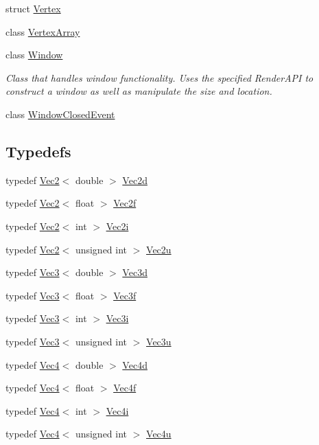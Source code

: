 \begin{DoxyCompactItemize}
\item 
struct \hyperlink{structpcs_1_1Vertex}{Vertex}
\item 
class \hyperlink{classpcs_1_1VertexArray}{Vertex\+Array}
\item 
class \hyperlink{classpcs_1_1Window}{Window}
\begin{DoxyCompactList}\small\item\em Class that handles window functionality. Uses the specified Render\+A\+PI to construct a window as well as manipulate the size and location. \end{DoxyCompactList}\item 
class \hyperlink{classpcs_1_1WindowClosedEvent}{Window\+Closed\+Event}
\end{DoxyCompactItemize}
\subsection*{Typedefs}
\begin{DoxyCompactItemize}
\item 
typedef \hyperlink{structpcs_1_1Vec2}{Vec2}$<$ double $>$ \hyperlink{namespacepcs_acc216b704c01ee5f725075dabe53e085}{Vec2d}
\item 
typedef \hyperlink{structpcs_1_1Vec2}{Vec2}$<$ float $>$ \hyperlink{namespacepcs_a4b2fd718bd0800b6aa492b1c60f19edc}{Vec2f}
\item 
typedef \hyperlink{structpcs_1_1Vec2}{Vec2}$<$ int $>$ \hyperlink{namespacepcs_af322f6d2ecaff325ab1ab8d243e1bc02}{Vec2i}
\item 
typedef \hyperlink{structpcs_1_1Vec2}{Vec2}$<$ unsigned int $>$ \hyperlink{namespacepcs_a3765be05787916d050ad7203dd4a9064}{Vec2u}
\item 
typedef \hyperlink{structpcs_1_1Vec3}{Vec3}$<$ double $>$ \hyperlink{namespacepcs_ad162884a2f34ac8048b26b5393a41981}{Vec3d}
\item 
typedef \hyperlink{structpcs_1_1Vec3}{Vec3}$<$ float $>$ \hyperlink{namespacepcs_a68e0f517680976c17c810ffe6952cbab}{Vec3f}
\item 
typedef \hyperlink{structpcs_1_1Vec3}{Vec3}$<$ int $>$ \hyperlink{namespacepcs_a90c0b9d4184dcb79e95ac2ce79287614}{Vec3i}
\item 
typedef \hyperlink{structpcs_1_1Vec3}{Vec3}$<$ unsigned int $>$ \hyperlink{namespacepcs_a2fb79528e302be33c240f71df13454ac}{Vec3u}
\item 
typedef \hyperlink{structpcs_1_1Vec4}{Vec4}$<$ double $>$ \hyperlink{namespacepcs_a16e5649fe0d83b923040c93b9895f9c9}{Vec4d}
\item 
typedef \hyperlink{structpcs_1_1Vec4}{Vec4}$<$ float $>$ \hyperlink{namespacepcs_a826b4146f438aa3a4c6a5c157bc8dea2}{Vec4f}
\item 
typedef \hyperlink{structpcs_1_1Vec4}{Vec4}$<$ int $>$ \hyperlink{namespacepcs_acc781a5c34ea403d128e3e500c74d9ad}{Vec4i}
\item 
typedef \hyperlink{structpcs_1_1Vec4}{Vec4}$<$ unsigned int $>$ \hyperlink{namespacepcs_a4adb2d4806269c0560cf9dee9a4bbf86}{Vec4u}
\end{DoxyCompactItemize}
